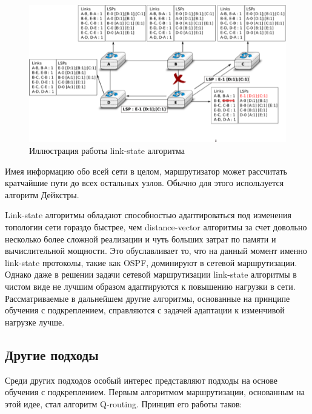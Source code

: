 \documentclass[]{itmo-student-thesis}
\begin{document}
\begin{figure}[!h]
  \caption{Иллюстрация работы link-state алгоритма}\label{ospf-img}
  \centering
  \includegraphics[scale=1.5]{ls-twoway}
\end{figure}

Имея информацию обо всей сети в целом, маршрутизатор может рассчитать кратчайшие
пути до всех остальных узлов. Обычно для этого используется алгоритм
Дейкстры\cite{dijkstra}. 

Link-state алгоритмы обладают способностью адаптироваться под изменения
топологии сети гораздо быстрее, чем distance-vector алгоритмы за счет довольно
несколько более сложной реализации и чуть больших затрат по памяти и
вычислительной мощности. Это обуславливает то, что на данный момент именно
link-state протоколы, такие как OSPF\cite{ospf-rfc}, доминируют в сетевой
маршрутизации. Однако даже в решении задачи сетевой маршрутизации link-state
алгоритмы в чистом виде не лучшим образом адаптируются к повышению нагрузки в
сети. Рассматриваемые в дальнейшем другие алгоритмы, основанные на принципе
обучения с подкреплением, справляются с задачей адаптации к
изменчивой нагрузке лучше.

\subsection{Другие подходы}

Среди других подходов особый интерес представляют подходы на основе обучения с
подкреплением. Первым алгоритмом маршрутизации, основанным на этой идее, стал
алгоритм Q-routing\cite{q-routing-orig}. Принцип его работы таков:
\end{document}
